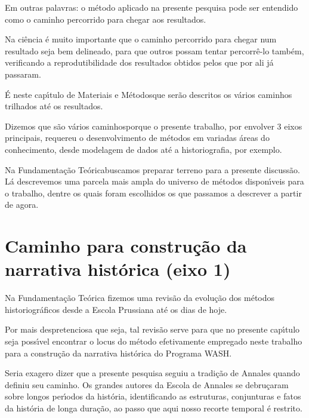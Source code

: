 \documentclass[
12pt,		%
openright,	%
twoside,  %
a4paper,			%
chapter=TITLE,		%
english,			%
french,				%
spanish,			%
brazil				%
]{USPSC-classe/USPSC}
\begin{document}
Em outras palavras: o m\'etodo aplicado na presente pesquisa pode ser entendido como o caminho percorrido para chegar aos resultados.




Na ci\^encia \'e muito importante que o caminho percorrido para chegar num resultado seja bem delineado, para que outros possam tentar percorr\^e-lo tamb\'em, verificando a reprodutibilidade dos resultados obtidos pelos que por ali j\'a passaram.




\'E neste cap\'{\i}tulo de \textquotedbl Materiais e M\'etodos\textquotedbl  que ser\~ao descritos os v\'arios caminhos trilhados at\'e os resultados.




Dizemos que s\~ao \textquotedbl v\'arios caminhos\textquotedbl  porque o presente trabalho, por envolver 3 eixos principais, requereu o desenvolvimento de m\'etodos em variadas \'areas do conhecimento, desde modelagem de dados at\'e a historiografia, por exemplo.




Na \textquotedbl Fundamenta\c{c}\~ao Te\'orica\textquotedbl  buscamos preparar terreno para a presente discuss\~ao. L\'a descrevemos uma parcela mais ampla do universo de m\'etodos dispon\'{\i}veis para o trabalho, dentre os quais foram escolhidos os que passamos a descrever a partir de agora.




\section[Caminho para constru\c{c}\~ao da narrativa hist\'orica (eixo 1)]{Caminho para constru\c{c}\~ao da narrativa hist\'orica (eixo 1)}\label{Caminho para constru\c{c}\~ao da narrativa hist\'orica (eixo 1)}
Na Fundamenta\c{c}\~ao Te\'orica fizemos uma revis\~ao da evolu\c{c}\~ao dos m\'etodos historiogr\'aficos desde a Escola Prussiana at\'e os dias de hoje.




Por mais despretenciosa que seja, tal revis\~ao serve para que no presente cap\'{\i}tulo seja poss\'{\i}vel encontrar o locus do m\'etodo efetivamente empregado neste trabalho para a constru\c{c}\~ao da narrativa hist\'orica do Programa WASH.




Seria exagero dizer que a presente pesquisa seguiu a tradi\c{c}\~ao de Annales quando definiu seu caminho.  Os grandes autores da Escola de Annales se debru\c{c}aram sobre longos per\'{\i}odos da hist\'oria, identificando as estruturas, conjunturas e fatos da \textquotedbl hist\'oria de longa dura\c{c}\~ao\textquotedbl , ao passo que aqui nosso recorte temporal \'e restrito.
\end{document}
